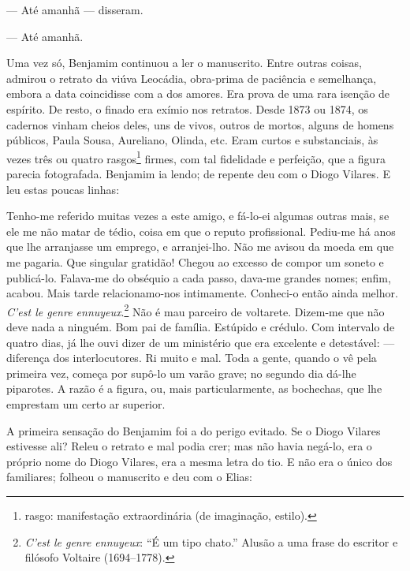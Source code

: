 --- Até amanhã --- disseram.

--- Até amanhã.

Uma vez só, Benjamim continuou a ler o manuscrito. Entre outras coisas,
admirou o retrato da viúva Leocádia, obra-prima de paciência e
semelhança, embora a data coincidisse com a dos amores. Era prova de uma
rara isenção de espírito. De resto, o finado era exímio nos retratos.
Desde 1873 ou 1874, os cadernos vinham cheios deles, uns de vivos,
outros de mortos, alguns de homens públicos, Paula Sousa, Aureliano,
Olinda, etc. Eram curtos e substanciais, às vezes três ou quatro
rasgos\footnote{rasgo: manifestação extraordinária (de imaginação,
  estilo).} firmes, com tal fidelidade e perfeição, que a figura parecia
fotografada. Benjamim ia lendo; de repente deu com o Diogo Vilares. E
leu estas poucas linhas:

 Tenho-me referido muitas vezes a este amigo, e
fá-lo-ei algumas outras mais, se ele me não matar de tédio, coisa em que
o reputo profissional. Pediu-me há anos que lhe arranjasse um emprego, e
arranjei-lho. Não me avisou da moeda em que me pagaria. Que singular
gratidão! Chegou ao excesso de compor um soneto e publicá-lo. Falava-me
do obséquio a cada passo, dava-me grandes nomes; enfim, acabou. Mais
tarde relacionamo-nos intimamente. Conheci-o então ainda melhor.
\emph{C'est le genre ennuyeux}.\footnote{\emph{C'est le genre ennuyeux}:
  ``É um tipo chato.'' Alusão a uma frase do escritor e filósofo
  Voltaire (1694--1778).} Não é mau parceiro de voltarete. Dizem-me que
não deve nada a ninguém. Bom pai de família. Estúpido e crédulo. Com
intervalo de quatro dias, já lhe ouvi dizer de um ministério que era
excelente e detestável: --- diferença dos interlocutores. Ri muito e
mal. Toda a gente, quando o vê pela primeira vez, começa por supô-lo um
varão grave; no segundo dia dá-lhe piparotes. A razão é a figura, ou,
mais particularmente, as bochechas, que lhe emprestam um certo ar
superior.

A primeira sensação do Benjamim foi a do perigo evitado. Se o Diogo
Vilares estivesse ali? Releu o retrato e mal podia crer; mas não havia
negá-lo, era o próprio nome do Diogo Vilares, era a mesma letra do tio.
E não era o único dos familiares; folheou o manuscrito e deu com o
Elias:

